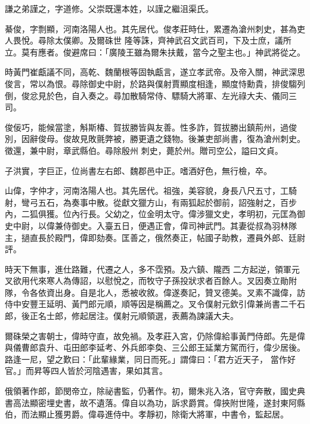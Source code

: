 \begin{pinyinscope}
 謙之弟謹之，字道修。父崇既還本姓，以謹之繼沮渠氏。



 綦俊，字剽顯，河南洛陽人也。其先居代。俊孝莊時仕，累遷為滄州刺史，甚為吏人畏悅。尋除太僕卿。及爾硃世
 隆等誅，齊神武召文武百司，下及士庶，議所立。莫有應者。俊避席曰：「廣陵王雖為爾朱扶戴，當今之聖主也。」神武將從之。



 時黃門崔甗議不同，高乾、魏蘭根等固執甗言，遂立孝武帝。及帝入關，神武深思俊言，常以為恨。尋除御史中尉，於路與僕射賈顯度相逢，顯度恃勳貴，排俊騶列倒，俊忿見於色，自入奏之。尋加散騎常侍、驃騎大將軍、左光祿大夫、儀同三司。



 俊佞巧，能候當塗，斛斯椿、賀拔勝皆與友善。性多詐，賀拔勝出鎮荊州，過俊別，因辭俊母。俊故見敗氈弊被，勝更遺之錢物。後兼吏部尚書，復為滄州刺史。徵還，兼中尉，章武縣伯。尋除殷州
 刺史，薨於州。贈司空公，謚曰文貞。



 子洪實，字巨正，位尚書左右郎、魏郡邑中正。嗜酒好色，無行檢，卒。



 山偉，字仲才，河南洛陽人也。其先居代。祖強，美容貌，身長八尺五寸，工騎射，彎弓五石，為奏事中散。從獻文獵方山，有兩狐起於御前，詔強射之，百步內，二狐俱獲。位內行長。父幼之，位金明太守。偉涉獵文史，孝明初，元匡為御史中尉，以偉兼侍御史。入臺五日，便遇正會，偉司神武門。其妻從叔為羽林隊主，撾直長於殿門，偉即劾奏。匡善之，俄然奏正，帖國子助教，遷員外郎、廷尉評。



 時天下無事，進仕路難，代遷之人，多不霑預。及六鎮、隴西
 二方起逆，領軍元叉欲用代來寒人為傳詔，以慰悅之，而牧守子孫投狀求者百餘人。叉因奏立勛附隊，令各依資出身。自是北人，悉被收敘。偉遂奏記，贊叉德美。叉素不識偉，訪侍中安豐王延明、黃門郎元順，順等因是稱薦之。叉令僕射元欽引偉兼尚書二千石郎，後正名士郎，修起居注。僕射元順領選，表薦為諫議大夫。



 爾硃榮之害朝士，偉時守直，故免禍。及孝莊入宮，仍除偉給事黃門侍郎。先是偉與儀曹郎袁升、屯田郎李延考、外兵郎李奐、三公郎王延業方駕而行，偉少居後。路逢一尼，望之歎曰：「此輩緣業，同日而死。」謂偉曰：「君方近天子，
 當作好官。」而昇等四人皆於河陰遇害，果如其言。



 俄領著作郎，節閔帝立，除祕書監，仍著作。初，爾朱兆入洛，官守奔散，國史典書高法顯密埋史書，故不遺落。偉自以為功，訴求爵賞。偉挾附世隆，遂封東阿縣伯，而法顯止獲男爵。偉尋進侍中。孝靜初，除衛大將軍，中書令，監起居。




\end{pinyinscope}
